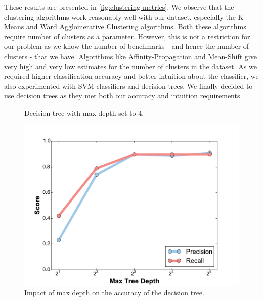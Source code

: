 These results are presented in \cref{fig:clustering-metrics}. We observe that
the clustering algorithms work reasonably well with our dataset.
especially the K-Means and Ward Agglomerative Clustering algorithms. 
Both these algorithms require number of clusters as a parameter. 
However, this is not a restriction for our problem as we know the number of
benchmarks - and hence the number of clusters - that we have.
Algorithms like Affinity-Propagation and Mean-Shift give very high and 
very low estimates for the number of clusters in the dataset.
As we required higher classification accuracy and better intuition about
the classifier, we also experimented with SVM classifiers and decision trees. 
We finally decided to use decision trees as they met both our accuracy
and intuition requirements.

\begin{figure}[h!]
    \centering
    \caption{Decision tree with max depth set to 4.}
    \label{fig:tree_4}
\end{figure}

\begin{figure}[h!]
    \centering
	\includegraphics[width=0.7\linewidth]{figure/depth.pdf}
	\caption{Impact of max depth on the accuracy of the decision tree.}
\end{figure}


